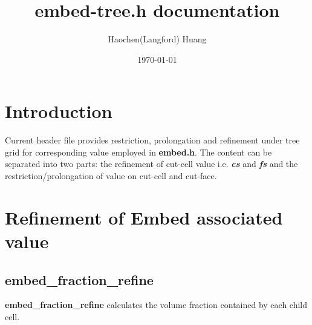 \documentclass[a4paper]{article}
\title{embed-tree.h documentation}
\author{Haochen(Langford) Huang}
\date{\today}
\newcommand{\func}[1]{\textbf{\textcolor{function}{#1}}}
\newcommand{\para}[1]{\textbf{\emph{\textcolor{para}{#1}}}}
\begin{document}
\maketitle
\section{Introduction}
Current header file provides restriction, prolongation and refinement under tree grid for corresponding value employed in \textbf{embed.h}. The content can be separated into two parts: the refinement of cut-cell value i.e. \para{cs} and \para{fs} and the restriction/prolongation of value on cut-cell and cut-face.

\section{Refinement of Embed associated value}
\subsection{\func{embed\_fraction\_refine}}
\func{embed\_fraction\_refine} calculates the volume fraction contained by each child cell.
\end{document}
